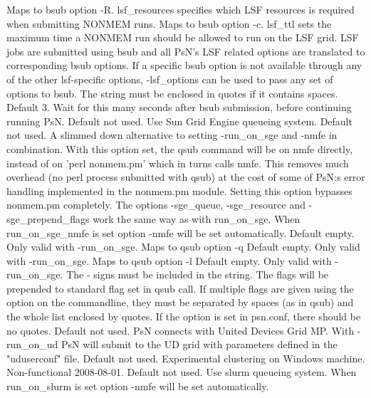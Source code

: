 \begin{optionlist}
\nextopt
{}
Maps to bsub option -R. lsf\_resources specifies which LSF resources is required when submitting NONMEM runs. 
\nextopt
{}
Maps to bsub option -c. lsf\_ttl sets the maximum time a NONMEM run should be allowed to run on the LSF grid. 
\nextopt
{}
LSF jobs are submitted using bsub and all PsN's LSF related options are translated to corresponding bsub options. If a specific bsub option is not available through any of the other lsf-specific options, -lsf\_options can be used to pass any set of options to bsub. The string must be enclosed in quotes if it contains spaces. 
\nextopt
{}
Default 3. Wait for this many seconds after bsub submission, before continuing running PsN. 
\nextopt
{}
Default not used. Use Sun Grid Engine queueing system. 
\nextopt
{}
Default not used. A slimmed down alternative to setting -run\_on\_sge and -nmfe in combination. With this option set, the qsub command will be on nmfe directly, instead of on 'perl nonmem.pm' which in turns calls nmfe. This removes much overhead (no perl process submitted with qsub) at the cost of some of PsN:s error handling implemented in the nonmem.pm module. Setting this option bypasses nonmem.pm completely. The options -sge\_queue, -sge\_resource and -sge\_prepend\_flags work the same way as with run\_on\_sge. When run\_on\_sge\_nmfe is set option -nmfe will be set automatically.  
\nextopt
{}
Default empty. Only valid with -run\_on\_sge. Maps to qsub option -q 
\nextopt
{}
Default empty. Only valid with -run\_on\_sge. Maps to qsub option -l 
\nextopt
{}
Default empty. Only valid with -run\_on\_sge. The - signs must be included in the string. The flags will be prepended to standard flag set in qsub call. If multiple flags are given using the option on the commandline, they must be separated by spaces (as in qsub) and the whole list enclosed by quotes. If the option is set in psn.conf, there should be no quotes. 
\nextopt
{}
Default not used. PsN connects with United Devices Grid MP. With -run\_on\_ud PsN will submit to the UD grid with parameters defined in the "uduserconf" file. 
\nextopt
{}
Default not used. Experimental clustering on Windows machine. Non-functional 2008-08-01. 
\nextopt
{}
Default not used. Use slurm queueing system. When run\_on\_slurm is set option -nmfe will be set automatically. 

\end{optionlist}
